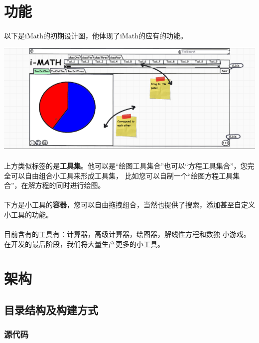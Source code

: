 \documentclass[12pt,a4paper,titlepage]{article}
\begin{document}
\section{功能}
\paragraph{}
以下是iMath的初期设计图，他体现了iMath的应有的功能。

\includegraphics[width=\textwidth]{init1.1.png}

\paragraph{}
上方类似标签的是\textbf{工具集}。他可以是“绘图工具集合”也可以“方程工具集合”，您完全可以自由组合小工具来形成工具集，
比如您可以自制一个“绘图方程工具集合”，在解方程的同时进行绘图。

\paragraph{}
下方是小工具的\textbf{容器}，您可以自由拖拽组合，当然也提供了搜索，添加甚至自定义小工具的功能。

\paragraph{}
目前含有的工具有：计算器，高级计算器，绘图器，解线性方程和数独 小游戏。
在开发的最后阶段，我们将大量生产更多的小工具。

\section{架构}

\subsection{目录结构及构建方式}

\subsubsection{源代码}
\end{document}
